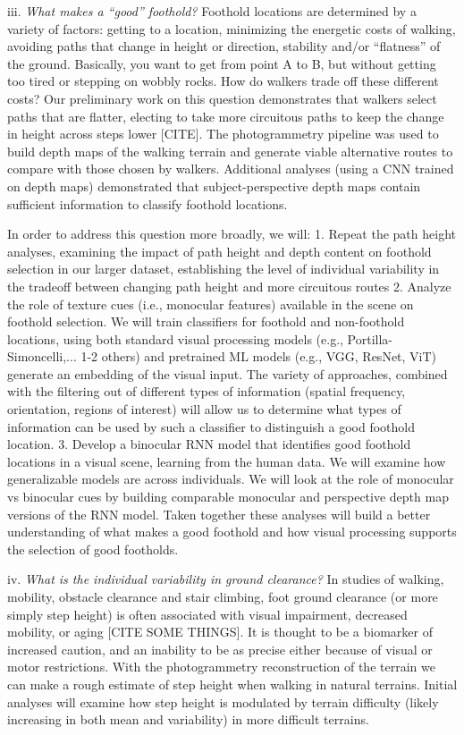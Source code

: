 iii. \emph{What makes a ``good'' foothold?} Foothold locations are
determined by a variety of factors: getting to a location, minimizing
the energetic costs of walking, avoiding paths that change in height or
direction, stability and/or ``flatness'' of the ground. Basically, you
want to get from point A to B, but without getting too tired or stepping
on wobbly rocks. How do walkers trade off these different costs? Our
preliminary work on this question demonstrates that walkers select paths
that are flatter, electing to take more circuitous paths to keep the
change in height across steps lower {[}CITE{]}. The photogrammetry
pipeline was used to build depth maps of the walking terrain and
generate viable alternative routes to compare with those chosen by
walkers. Additional analyses (using a CNN trained on depth maps)
demonstrated that subject-perspective depth maps contain sufficient
information to classify foothold locations.

In order to address this question more broadly, we will: 1. Repeat the
path height analyses, examining the impact of path height and depth
content on foothold selection in our larger dataset, establishing the
level of individual variability in the tradeoff between changing path
height and more circuitous routes 2. Analyze the role of texture cues
(i.e., monocular features) available in the scene on foothold selection.
We will train classifiers for foothold and non-foothold locations, using
both standard visual processing models (e.g., Portilla-Simoncelli,...
1-2 others) and pretrained ML models (e.g., VGG, ResNet, ViT) generate
an embedding of the visual input. The variety of approaches, combined
with the filtering out of different types of information (spatial
frequency, orientation, regions of interest) will allow us to determine
what types of information can be used by such a classifier to
distinguish a good foothold location. 3. Develop a binocular RNN model
that identifies good foothold locations in a visual scene, learning from
the human data. We will examine how generalizable models are across
individuals. We will look at the role of monocular vs binocular cues by
building comparable monocular and perspective depth map versions of the
RNN model. Taken together these analyses will build a better
understanding of what makes a good foothold and how visual processing
supports the selection of good footholds.

iv. \emph{What is the individual variability in ground clearance?} In
studies of walking, mobility, obstacle clearance and stair climbing,
foot ground clearance (or more simply step height) is often associated
with visual impairment, decreased mobility, or aging {[}CITE SOME
THINGS{]}. It is thought to be a biomarker of increased caution, and an
inability to be as precise either because of visual or motor
restrictions. With the photogrammetry reconstruction of the terrain we
can make a rough estimate of step height when walking in natural
terrains. Initial analyses will examine how step height is modulated by
terrain difficulty (likely increasing in both mean and variability) in
more difficult terrains.

